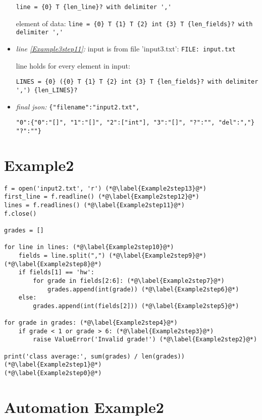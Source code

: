 \documentclass[11pt]{article}
\begin{document}
\begin{itemize}
\verb|line = {0} T {len_line}? with delimiter ','|

element of data: \verb|line = {0} T {1} T {2} int {3} T {len_fields}? with delimiter ','|

\item \textit{line \ref{Example3step11}:} input is from file 'input3.txt': \verb|FILE: input.txt|

line holds for every element in input: 

\verb|LINES = {0} ({0} T {1} T {2} int {3} T {len_fields}? with delimiter ',') {len_LINES}?|

\item \textit{final json:} \verb|{"filename":"input2.txt",|

\verb|"0":{"0":"[]", "1":"[]", "2":["int"], "3":"[]", "?":"", "del":","} "?":""}|



\end{itemize}


\section{Example2}


\begin{lstlisting}
f = open('input2.txt', 'r') (*@\label{Example2step13}@*) 
first_line = f.readline() (*@\label{Example2step12}@*) 
lines = f.readlines() (*@\label{Example2step11}@*) 
f.close()

grades = []

for line in lines: (*@\label{Example2step10}@*) 
    fields = line.split(",") (*@\label{Example2step9}@*) 
(*@\label{Example2step8}@*) 
    if fields[1] == 'hw':
        for grade in fields[2:6]: (*@\label{Example2step7}@*) 
            grades.append(int(grade)) (*@\label{Example2step6}@*) 
    else:
        grades.append(int(fields[2])) (*@\label{Example2step5}@*) 

for grade in grades: (*@\label{Example2step4}@*) 
    if grade < 1 or grade > 6: (*@\label{Example2step3}@*) 
        raise ValueError('Invalid grade!') (*@\label{Example2step2}@*) 

print('class average:', sum(grades) / len(grades)) (*@\label{Example2step1}@*) 
(*@\label{Example2step0}@*) 
\end{lstlisting}

\section{Automation Example2}
\end{document}
